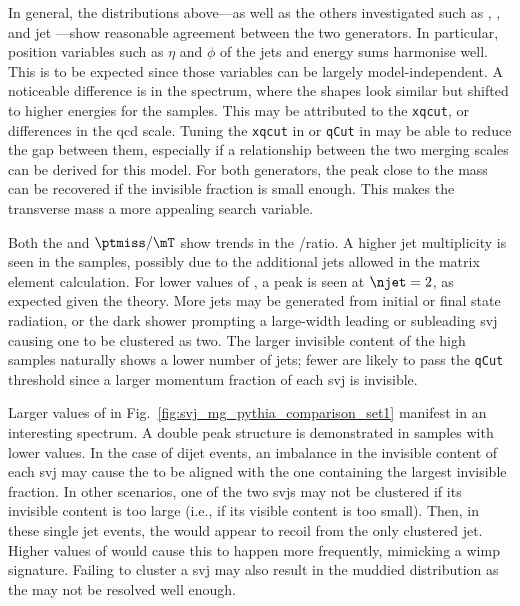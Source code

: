 In general, the distributions above---as well as the others investigated such as \ptmiss, \mht, and \gls{jet} \pt---show reasonable agreement between the two generators. In particular, position variables such as $\eta$ and $\phi$ of the \glspl{jet} and energy sums harmonise well. This is to be expected since those variables can be largely model-independent. A noticeable difference is in the \mT spectrum, where the shapes look similar but shifted to higher energies for the \MADGRAPH samples. This may be attributed to the \texttt{xqcut}, or differences in the \acrshort{qcd} scale. Tuning the \texttt{xqcut} in \MADGRAPH or \texttt{qCut} in \PYTHIA may be able to reduce the gap between them, especially if a relationship between the two merging scales can be derived for this model. For both generators, the peak close to the \PZprime mass can be recovered if the invisible fraction is small enough. This makes the transverse mass a more appealing search variable.

Both the \njet and $\ptmiss/\mT$ show trends in the \MADGRAPH/\PYTHIA ratio. A higher \gls{jet} multiplicity is seen in the \MADGRAPH samples, possibly due to the additional \glspl{jet} allowed in the matrix element calculation. For lower values of \rinv, a peak is seen at $\njet = \text{2}$, as expected given the theory. More \glspl{jet} may be generated from initial or final state radiation, or the dark shower prompting a large-width leading or subleading \gls{svj} causing one to be clustered as two. The larger invisible content of the high \rinv samples naturally shows a lower number of \glspl{jet}; fewer are likely to pass the \texttt{qCut} threshold since a larger momentum fraction of each \gls{svj} is invisible.

Larger values of \rinv in Fig.~\ref{fig:svj_mg_pythia_comparison_set1} manifest in an interesting \mindphi spectrum. A double peak structure is demonstrated in samples with lower values. In the case of dijet events, an imbalance in the invisible content of each \gls{svj} may cause the \ptmiss to be aligned with the one containing the largest invisible fraction. In other scenarios, one of the two \glspl{svj} may not be clustered if its invisible content is too large (i.e., if its visible content is too small). Then, in these single \gls{jet} events, the \ptmiss would appear to recoil from the only clustered jet. Higher values of \rinv would cause this to happen more frequently, mimicking a \acrshort{wimp} signature. Failing to cluster a \gls{svj} may also result in the muddied \mT distribution as the \ptvecmiss may not be resolved well enough.


